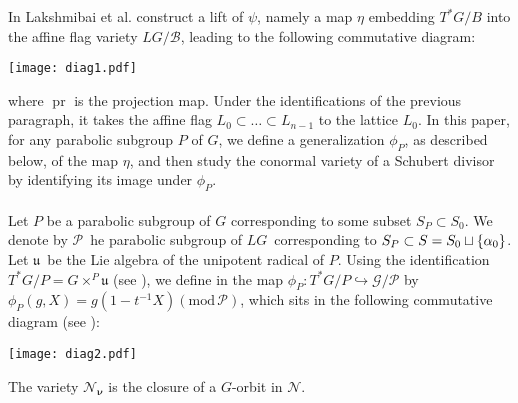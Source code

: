 \documentclass[paper=a4, fontsize=10pt]{amsart} %
\theoremstyle{plain}
\theoremstyle{definition}
\theoremstyle{remark}
\numberwithin{equation}{section} %
\numberwithin{figure}{section} %
\numberwithin{table}{section} %
\numberwithin{subsection}{section} %
\def\borel{\ensuremath{B}}
\def\Borel{\ensuremath{\mathcal B}}
\def\simple{\ensuremath{\Simple_0}}
\def\Simple{\ensuremath S}
\def\gl{\ensuremath{G}}
\def\gL{\ensuremath{L\gl}}
\def\gLhat{\gL}
\def\gOhat{\ensuremath{L^+\gl}}
\def\gO{\gOhat}
\def\para{\ensuremath{P}}
\def\Para{\ensuremath{\mathcal P}}
\def\u{\ensuremath{\mathfrak u}}
\def\Ni{\ensuremath{\mathcal N}}
\def\thetav{\ensuremath{\theta_P}}
\begin{document}
In \cite{crv} Lakshmibai et al. construct a lift of $\psi$, namely a map $\eta$ embedding $T^*\gl/\borel$ into the affine flag variety $\gLhat/\Borel$, leading to the following commutative diagram:\begin{center}
\texttt{[image: diag1.pdf]}
\end{center}
where $\operatorname{pr}$ is the projection map. 
Under the identifications of the previous paragraph, it takes the affine flag $L_0\subset\ldots\subset L_{n-1}$ to the lattice $L_0$.
In this paper, for any parabolic subgroup $P$ of $G$, we define a generalization $\phi_P$, as described below,
of the map $\eta$, and then study the conormal variety of a Schubert divisor by identifying its image under $\phi_P$.
\\
\\
Let $P$ be a parabolic subgroup of $G$ corresponding to some subset $S_P\subset S_0$. 
We denote by \Para\ he parabolic subgroup of \gLhat\ corresponding to $S_P\subset S=\simple\sqcup\{\alpha_0\}$.
Let \u\ be the Lie algebra of the unipotent radical of $P$.
Using the identification  $T^*\gl/\para=\gl\times^\para\u$ (see ), we define in  the map $\phi_\para:T^*G/P\hookrightarrow\mathcal G/\Para$ by $\phi_\para(g,X)=g\left(1-t^{-1}X\right)(\mathrm{mod}\,\Para)$, which sits in the following commutative diagram (see ):
\begin{center}
\texttt{[image: diag2.pdf]}
\end{center}
\vspace{-2pt}
The variety $\Ni_{\boldsymbol\nu}$ is the closure of a \gl-orbit in \Ni. 
\end{document}
